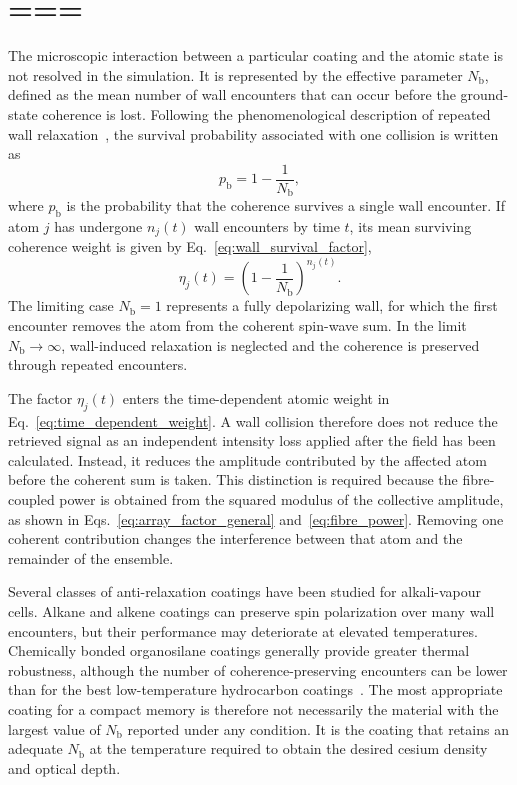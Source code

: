 \section{===}

The microscopic interaction between a particular coating and the atomic state is not resolved in the simulation. It is represented by the effective parameter $N_{\mathrm{b}}$, defined as the mean number of wall encounters that can occur before the ground-state coherence is lost. Following the phenomenological description of repeated wall relaxation~\cite{OP_Happer_1972,Aiacoavc_ChiEtAl_2020}, the survival probability associated with one collision is written as
\begin{equation}
p_{\mathrm{b}}
=
1-\frac{1}{N_{\mathrm{b}}},
\label{eq:results_single_bounce_survival}
\end{equation}
where $p_{\mathrm{b}}$ is the probability that the coherence survives a single wall encounter. If atom $j$ has undergone $n_j(t)$ wall encounters by time $t$, its mean surviving coherence weight is given by Eq.~\eqref{eq:wall_survival_factor},
\begin{equation*}
\eta_j(t)
=
\left(
1-\frac{1}{N_{\mathrm{b}}}
\right)^{n_j(t)}.
\end{equation*}
The limiting case $N_{\mathrm{b}}=1$ represents a fully depolarizing wall, for which the first encounter removes the atom from the coherent spin-wave sum. In the limit $N_{\mathrm{b}}\rightarrow\infty$, wall-induced relaxation is neglected and the coherence is preserved through repeated encounters.

The factor $\eta_j(t)$ enters the time-dependent atomic weight in Eq.~\eqref{eq:time_dependent_weight}. A wall collision therefore does not reduce the retrieved signal as an independent intensity loss applied after the field has been calculated. Instead, it reduces the amplitude contributed by the affected atom before the coherent sum is taken. This distinction is required because the fibre-coupled power is obtained from the squared modulus of the collective amplitude, as shown in Eqs.~\eqref{eq:array_factor_general} and~\eqref{eq:fibre_power}. Removing one coherent contribution changes the interference between that atom and the remainder of the ensemble.

Several classes of anti-relaxation coatings have been studied for alkali-vapour cells. Alkane and alkene coatings can preserve spin polarization over many wall encounters, but their performance may deteriorate at elevated temperatures. Chemically bonded organosilane coatings generally provide greater thermal robustness, although the number of coherence-preserving encounters can be lower than for the best low-temperature hydrocarbon coatings~\cite{Aiacoavc_ChiEtAl_2020}. The most appropriate coating for a compact memory is therefore not necessarily the material with the largest value of $N_{\mathrm{b}}$ reported under any condition. It is the coating that retains an adequate $N_{\mathrm{b}}$ at the temperature required to obtain the desired cesium density and optical depth.


